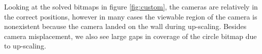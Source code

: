 \documentclass[11pt]{article}
\begin{document}
Looking at the solved bitmaps in figure \ref{fig:custom}, the cameras are relatively in the correct positions, however in many cases the viewable region of the camera is nonexistent because the camera landed on the wall during up-scaling. Besides camera misplacement, we also see large gaps in coverage of the circle bitmap due to up-scaling.
\begin{figure}[H]%
    \centering
    \qquad
    \qquad
    \qquad

\end{figure}
\end{document}
